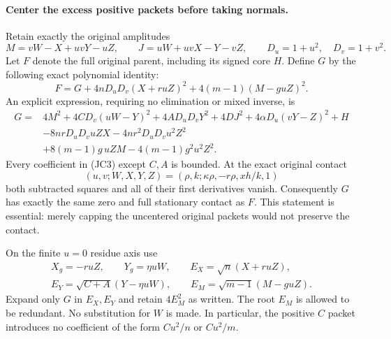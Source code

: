 \paragraph{Center the excess positive packets before taking normals.}
Retain exactly the original amplitudes
\[
 M=vW-X+uvY-uZ,\qquad J=uW+uvX-Y-vZ,
 \qquad D_u=1+u^2,\quad D_v=1+v^2.
\]
Let $F$ denote the full original parent, including its signed core
$H$.  Define $G$ by the following exact polynomial identity:
\[
 F=G+4nD_uD_v(X+ruZ)^2
             +4(m-1)(M-guZ)^2.                       \tag{JC2}
\]
An explicit expression, requiring no elimination or mixed inverse, is
\begin{align*}
G={}&4M^2+4CD_v(uW-Y)^2+4AD_uD_vY^2
       +4DJ^2+4\alpha D_u(vY-Z)^2+H\\
 &-8nrD_uD_vuZX-4nr^2D_uD_vu^2Z^2\\
 &+8(m-1)g\,uZM-4(m-1)g^2u^2Z^2.                  \tag{JC3}
\end{align*}
Every coefficient in (JC3) except $C,A$ is bounded.  At the exact
original contact
\[
 (u,v;W,X,Y,Z)=(\rho,k;\kappa\rho,-r\rho,xh/k,1)
\]
both subtracted squares and all of their first derivatives vanish.
Consequently $G$ has exactly the same zero and full stationary
contact as $F$.  This statement is essential: merely capping the
uncentered original packets would not preserve the contact.

On the finite $u=0$ residue axis use
\begin{gather*}
 X_g=-ruZ,\qquad Y_g=\eta uW,\qquad E_X=\sqrt n(X+ruZ),\\
 E_Y=\sqrt{C+A}(Y-\eta uW),\qquad
 E_M=\sqrt{m-1}(M-guZ).                              \tag{JC4}
\end{gather*}
Expand only $G$ in $E_X,E_Y$ and retain $4E_M^2$ as written.
The root $E_M$ is allowed to be redundant.  No substitution for
$W$ is made.  In particular, the positive $C$ packet introduces
no coefficient of the form $Cu^2/n$ or $Cu^2/m$.

